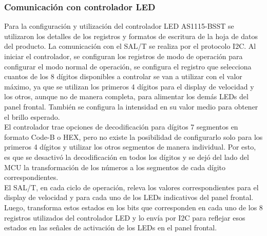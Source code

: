 \subsubsection{Comunicación con controlador LED}

Para la configuración y utilización del controlador LED AS1115-BSST se utilizaron los detalles de los registros y formatos de escritura de la hoja de datos del producto. La comunicación con el SAL/T se realiza por el protocolo I2C. Al iniciar el controlador, se configuran los registros de modo de operación para configurar el modo normal de operación, se configura el registro que selecciona cuantos de los 8 dígitos disponibles a controlar se van a utilizar con el valor máximo, ya que se utilizan los primeros 4 dígitos para el display de velocidad y los otros, aunque no de manera completa, para alimentar los demás LEDs del panel frontal. También se configura la intensidad en su valor medio para obtener el brillo esperado. \\

El controlador trae opciones de decodificación para dígitos 7 segmentos en formato Code-B o HEX, pero no existe la posibilidad de configurarlo solo para los primeros 4 dígitos y utilizar los otros segmentos de manera individual. Por esto, es que se desactivó la decodificación en todos los dígitos y se dejó del lado del MCU la transformación de los números a los segmentos de cada dígito correspondientes.  \\ 


El SAL/T, en cada ciclo de operación, releva los valores correspondientes para el display de velocidad y para cada uno de los LEDs indicativos del panel frontal. Luego, transforma estos estados en los bits que corresponden en cada uno de los 8 registros utilizados del controlador LED y lo envía por I2C para reflejar esos estados en las señales de activación de los LEDs en el panel frontal. 

